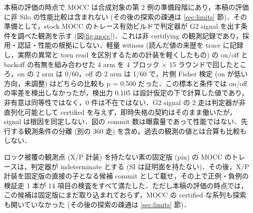 \documentclass[submit,techrep,noauthor]{ipsj}
\begin{document}
本稿の評価の時点で MOCC は合成対象の第 2 例の準備段階にあり，本稿の評価に非 Silo の性能比較は含まれない (その後の探索の疎通は \ref{sec:limits} 節)．その準備として，stock MOCC のトレース有効ビルドで判定器が G2 signal を出す条件を調べた観測を示す (図\ref{fig:mocc})．これは非 certifying の観測記録であり，採用・認証・性能の根拠にしない．軽量 witness (読んだ値の来歴を trace に記録し，実際の異常と torn read を区別するための計装を軽くしたもの) の on/off と backoff の有無を組み合わせた 4 arm を 4 ブロック $\times$ 15 ラウンドで回したところ，on の 2 arm は 0/60，off の 2 arm は 1/60 で，片側 Fisher 検定 (on が低い方向，未調整) はどちらの比較も p = 0.500 だった．この標本と条件では on/off の率差を検出しなかったが，検出力 0.105 は設計仮定の下で計算した値であり，非有意は同等性ではなく，0 件は不在ではない．G2 signal の 2 走は判定器が非直列化可能として certified を与えず，即時失格の契約はそのまま働いたが，signal は根因を同定しない．図の commit 数は曝露量であって性能ではない．先行する観測条件の分離 (別の 360 走) を含め，過去の観測の値とは合算も比較もしない．

ロック被覆の観測点 (X/P 計装) を持たない素の固定版 (pin) の MOCC のトレースは，判定器が indeterminate とする (SI は証明面を持たない)．その後，X/P 計装を固定版の直接の子となる候補 commit として載せ，その上で正例・負例の検証走 1 本が 14 項目の検査をすべて満たした．ただし本稿の評価の時点では，この候補は固定版にまだ取り込まれておらず，MOCC の certified な系列も探索も開いていなかった (その後の探索の疎通は \ref{sec:limits} 節)．
\end{document}
